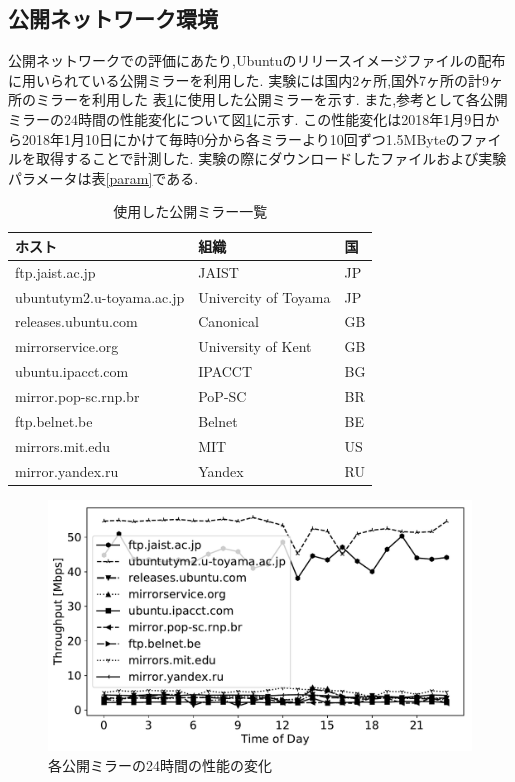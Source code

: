 \documentclass[a4j,12pt]{gradthesis_utf8}
\begin{document}
\newpage

\subsection{公開ネットワーク環境}
\label{pub}
公開ネットワークでの評価にあたり,Ubuntuのリリースイメージファイルの配布に用いられている公開ミラー\cite{ubuntu}を利用した.
実験には国内2ヶ所,国外7ヶ所の計9ヶ所のミラーを利用した
表\ref{tablemirror}に使用した公開ミラーを示す.
また,参考として各公開ミラーの24時間の性能変化について図\ref{24h}に示す.
この性能変化は2018年1月9日から2018年1月10日にかけて毎時0分から各ミラーより10回ずつ1.5MByteのファイルを取得することで計測した.
実験の際にダウンロードしたファイルおよび実験パラメータは表\ref{param}である.
\begin{table}[h]
	\begin{center}
		\caption{使用した公開ミラー一覧}
		\label{tablemirror}
		\begin{tabular}{|l|l|l|} \hline
			ホスト & 組織 & 国\\ \hline \hline
			ftp.jaist.ac.jp & JAIST & JP \\
			ubuntutym2.u-toyama.ac.jp & Univercity of Toyama & JP \\
			releases.ubuntu.com & Canonical & GB \\
			mirrorservice.org & University of Kent & GB \\
			ubuntu.ipacct.com & IPACCT & BG \\
			mirror.pop-sc.rnp.br & PoP-SC & BR \\
			ftp.belnet.be & Belnet & BE \\
			mirrors.mit.edu & MIT & US \\
			mirror.yandex.ru & Yandex & RU \\ \hline
		\end{tabular}
	\end{center}
\end{table}

\begin{figure}[h]
	\includegraphics[width=14cm]{figure/thp24h-g.pdf}
	\caption{各公開ミラーの24時間の性能の変化}
	\label{24h}
\end{figure}
\end{document}
